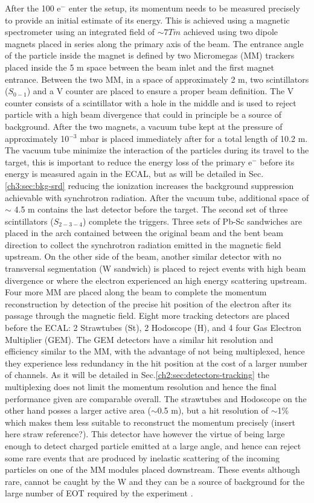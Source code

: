 After the 100 \gev e$^-$ enter the setup, its momentum needs to be measured precisely to provide an initial estimate of its energy. This is achieved using a magnetic spectrometer using an integrated field of $\sim 7 T \dot m$ achieved using two dipole magnets \cite{mbpl} placed in series along the primary axis of the beam. The entrance angle of the particle inside the magnet is defined by two Micromegas (MM) trackers placed inside the 5 m space between the beam inlet and the first magnet entrance. Between the two MM, in a space of approximately 2 m, two scintillators ($S_{0-1}$) and a V counter are placed to ensure a proper beam definition. The V counter consists of a scintillator with a hole in the middle and is used to reject particle with a high beam divergence that could in principle be a source of background. After the two magnets, a vacuum tube kept at the pressure of approximately 10$^{-3}$ \si{mbar} is placed immediately after for a total length of 10.2 \si{m}. The vacuum tube minimize the interaction of the particles during its travel to the target, this is important to reduce the energy loss of the primary e$^-$ before its energy is measured again in the ECAL, but as will be detailed in Sec.\ref{ch3:sec:bkg-srd} reducing the ionization increases the background suppression achievable with synchrotron radiation. After the vacuum tube, additional space of $\sim$ 4.5 \si{m} contains the last detector before the target. The second set of three scintillators ($S_{2-3-4}$) complete the triggers. Three sets of Pb-Sc sandwiches are placed in the arch contained between the original beam and the bent beam direction to collect the synchrotron radiation emitted in the magnetic field upstream. On the other side of the beam, another similar detector with no transversal segmentation (W sandwich) is placed to reject events with high beam divergence or where the electron experienced an high energy scattering upstream. Four more MM are placed along the beam to complete the momentum reconstruction by detection of the precise hit position of the electron after its passage through the magnetic field. Eight more tracking detectors are placed before the ECAL: 2 Strawtubes (St), 2 Hodoscope (H), and 4 four Gas Electron Multiplier (GEM). The GEM detectors have a similar hit resolution and efficiency similar to the MM, with the advantage of not being multiplexed, hence they experience less redundancy in the hit position at the cost of a larger number of channels. As it will be detailed in Sec.\ref{ch2:sec:detectors-tracking} the multiplexing does not limit the momentum resolution and hence the final performance given are comparable overall. The strawtubes and Hodoscope on the other hand posses a larger active area ($\sim$0.5 m), but a hit resolution of $\sim$1\% which makes them less suitable to reconstruct the momentum precisely (insert here straw reference?). This detector have however the virtue of being large enough to detect charged particle emitted at a large angle, and hence can reject some rare events that are produced by inelastic scattering of the incoming particles on one of the MM modules placed downstream. These events although rare, cannot be caught by the W and they can be a source of background for the large number of EOT required by the experiment \cite{na64-prd}. 

